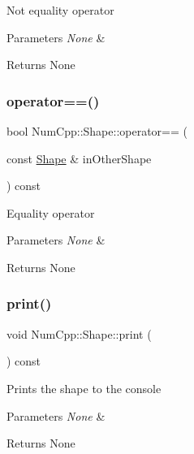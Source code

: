 Not equality operator


\begin{DoxyParams}{Parameters}
{\em None} & \\
\hline
\end{DoxyParams}
\begin{DoxyReturn}{Returns}
None 
\end{DoxyReturn}
\mbox{\label{class_num_cpp_1_1_shape_a902f3cf35a49e27f766eb75acd1d6159}} 
\subsubsection{\texorpdfstring{operator==()}{operator==()}}
{\footnotesize\ttfamily bool Num\+Cpp\+::\+Shape\+::operator== (\begin{DoxyParamCaption}\item[{const \mbox{\hyperlink{class_num_cpp_1_1_shape}{Shape}} \&}]{in\+Other\+Shape }\end{DoxyParamCaption}) const\hspace{0.3cm}{\ttfamily [inline]}}

Equality operator


\begin{DoxyParams}{Parameters}
{\em None} & \\
\hline
\end{DoxyParams}
\begin{DoxyReturn}{Returns}
None 
\end{DoxyReturn}
\mbox{\label{class_num_cpp_1_1_shape_a555a16decafeac68b21fa1db8761f859}} 
\subsubsection{\texorpdfstring{print()}{print()}}
{\footnotesize\ttfamily void Num\+Cpp\+::\+Shape\+::print (\begin{DoxyParamCaption}{ }\end{DoxyParamCaption}) const\hspace{0.3cm}{\ttfamily [inline]}}

Prints the shape to the console


\begin{DoxyParams}{Parameters}
{\em None} & \\
\hline
\end{DoxyParams}
\begin{DoxyReturn}{Returns}
None 
\end{DoxyReturn}
\mbox{\label{class_num_cpp_1_1_shape_abc2041396c701f43f04e8ec13262c4ba}} 
